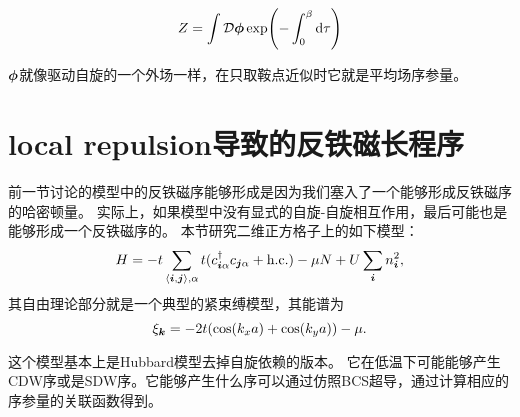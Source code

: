 \begin{equation}
    Z = \int \mathcal{D} \vb*{\phi} \exp(- \int_0^\beta \dd{\tau} )
\end{equation}

$\vb*{\phi}$就像驱动自旋的一个外场一样，在只取鞍点近似时它就是平均场序参量。

\section{local repulsion导致的反铁磁长程序}

前一节讨论的模型中的反铁磁序能够形成是因为我们塞入了一个能够形成反铁磁序的哈密顿量。
实际上，如果模型中没有显式的自旋-自旋相互作用，最后可能也是能够形成一个反铁磁序的。
本节研究二维正方格子上的如下模型：
\begin{equation}
    H = - t \sum_{\langle \vb*{i}, \vb*{j} \rangle, \alpha} t (c^\dagger_{\vb*{i} \alpha} c_{\vb*{j} \alpha} + \text{h.c.}) - \mu N + U \sum_{\vb*{i}} n_{\vb*{i}}^2,
\end{equation}
其自由理论部分就是一个典型的紧束缚模型，其能谱为
\begin{equation}
    \xi_{\vb*{k}} = - 2t (\cos(k_x a) + \cos(k_y a)) - \mu.
\end{equation}

这个模型基本上是Hubbard模型去掉自旋依赖的版本。
它在低温下可能能够产生CDW序或是SDW序。它能够产生什么序可以通过仿照BCS超导，通过计算相应的序参量的关联函数得到。

